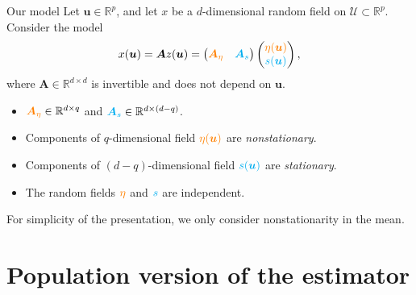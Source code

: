 \documentclass{beamer}
\begin{document}
\begin{frame}{Our model}
  Let $\bm u\in\mathbb{R}^p$, and let $x$ be a $d$-dimensional random field on
  $\mathcal{U}\subset\mathbb{R}^p$. Consider the model
  \begin{equation*}
    x(\bm u) = \bm A z(\bm u)
    = \begin{pmatrix}
      \textcolor{orange}{\bm A_\eta}
      & \textcolor{Cyan}{\bm A_s}
    \end{pmatrix}
    \begin{pmatrix}
      \textcolor{orange}{\eta(\bm u)} \\ \textcolor{Cyan}{s(\bm u)}
    \end{pmatrix},
  \end{equation*}
  where $\bm A\in\mathbb{R}^{d\times d}$ is invertible and does not depend on
  $\bm u$.
  \begin{itemize}
    \item $\textcolor{orange}{\bm A_\eta}\in\mathbb{R}^{d\times q}$ and
    $\textcolor{Cyan}{\bm A_s}\in\mathbb{R}^{d\times (d-q)}$.
    \pause
    \item Components of $q$-dimensional field $\textcolor{orange}{\eta(\bm u)}$
    are \emph{nonstationary}.
    \item Components of $(d-q)$-dimensional field $\textcolor{Cyan}{s(\bm u)}$
    are \emph{stationary}.
    \item The random fields $\textcolor{orange}{\eta}$ and $\textcolor{Cyan}{s}$
    are independent.
  \end{itemize}
\end{frame}


\begin{frame}
  For simplicity of the presentation, we only consider nonstationarity in the
  mean.
\end{frame}


\section{Population version of the estimator}
\end{document}
